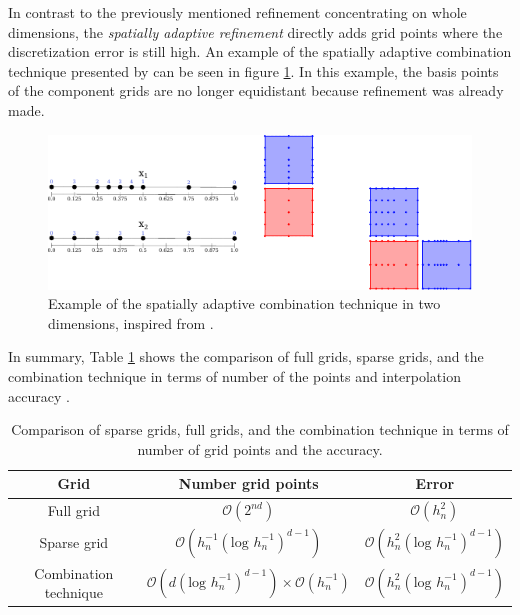 In contrast to the previously mentioned refinement concentrating on whole dimensions, the \textit{spatially adaptive refinement} directly adds grid points where the discretization error is still high. An example of the spatially adaptive combination technique presented by \cite{obersteiner2021generalized} can be seen in figure \ref{fig:spatially_adaptive_combi_technique}. In this example, the basis points of the component grids are no longer equidistant because refinement was already made. \newline 

\begin{figure}[H]
	\centering
	\includegraphics[width=\textwidth]{figures/Fig_2_11_adaptive_combigrid}
	\caption{ Example of the spatially adaptive combination technique in two dimensions, inspired from \cite{obersteiner2021generalized}. }
	\label{fig:spatially_adaptive_combi_technique}
\end{figure}


In summary, Table \ref{tab:comparison_grids} shows the comparison of full grids, sparse grids, and the combination technique in terms of number of the points and interpolation accuracy \cite{pfluger2010spatially}.


\begin{table}[H]
	\caption{ Comparison of sparse grids, full grids, and the combination technique in terms of number of grid points and the accuracy. }
	\label{tab:comparison_grids}
	\centering
	\begin{tabular}{|c c c|} 
		\hline
		Grid & Number grid points & Error \\
		\hline
		Full grid & $ \mathcal{O}\left(2^{nd}\right) $ & $ \mathcal{O}\left(h_n^2\right) $  \\
		Sparse grid & $ \mathcal{O}\left(h_n^{-1}\left(\text{log } h_n^{-1}\right)^{d-1}\right) $ & $ \mathcal{O}\left(h_n^{2}\left(\text{log } h_n^{-1}\right)^{d-1}\right) $ \\
		Combination technique & $ \mathcal{O}\left(d\left(\text{log } h_n^{-1}\right)^{d-1}\right) \times  \mathcal{O}\left(h_n^{-1}\right) $ & $ \mathcal{O}\left(h_n^{2}\left(\text{log } h_n^{-1}\right)^{d-1}\right) $\\
		\hline
	\end{tabular}
\end{table}

